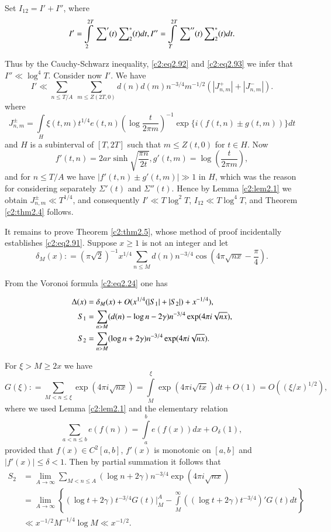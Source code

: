 Set $I_{12} = I'+ I''$, where
$$
I' = \int\limits_2^{2T} \sideset{}{'}\sum (t) \sideset{}{_2^*}\sum (t)
dt, I'' = \int\limits_T^{2T} \sideset{}{''}\sum(t) \sideset{}{_2^*}\sum (t) dt.
$$

Thus by the Cauchy-Schwarz inequality, \eqref{c2:eq2.92} and
\eqref{c2:eq2.93} we infer that $I'' \ll \log ^4 T$. Consider now
$I'$. We have
$$ 
I' \ll \sum_{n \leq T/A} ~\sum_{m \leq Z (2T,  0)} d(n) d (m) n^{-3/4}
m^{-1/2} \left(|J^+_{n, m}| +|J^-_{n, m}| \right).
$$
where\pageoriginale
$$
J^{\pm}_{n, m} = \int\limits_H \xi (t, m) t^{1/4} e (t, n) \left(\log
\frac{t}{2 \pi m} \right)^{-1} \exp \{ i (f (t, n) \pm g(t, m))\} dt
$$
and $H$ is a subinterval of $[T, 2 T]$ such that $m \leq Z(t, 0)$ for
$t \in H$. Now
$$
f' (t, n)= 2 ar \sinh \sqrt{\frac{\pi n}{2t}}, g' (t, m) = \log
\left(\frac{t}{2 \pi m} \right),
$$
and for $n \leq T/A$ we have $|f' (t, n) \pm g' (t, m)|\gg 1$ in $H$,
which was the reason for considering separately $\Sigma'(t)$ and
$\Sigma'' (t)$. Hence by Lemma \ref{c2:lem2.1} we obtain  $J^{\pm}_{n,
m} \ll T^{1/4}$, and consequently $I' \ll T \log^2 T$, $I_{12} \ll T
\log ^4 T$, and Theorem \ref{c2:thm2.4} follows.

It remains to prove Theorem \ref{c2:thm2.5}, whose method of proof
incidentally establishes \eqref{c2:eq2.91}. Suppose $x \geq 1$ is not
an integer and let
$$
\delta_M (x) : = (\pi \sqrt{2})^{-1} x^{1/4} \sum_{n \leq M} d(n)
n^{-3/4} \cos \left(4 \pi \sqrt{nx} - \frac{\pi}{4}\right).
$$

From the Voronoi formula \eqref{c2:eq2.24} one has

\begin{align}
  \Delta  (x) & = \delta_M (x) + O (x^{1/4}(|S_1|+ |S_2|)+
  x^{-1/4}),\label{c2:eq2.94}\\
  S_1 & = \sum_{n > M} (d(n) - \log n - 2 \gamma) n^{-3/4} \exp (4 \pi
  i \sqrt{nx}),\notag\\
  S_2 & = \sum_{n > M} (\log n + 2 \gamma) n^{-3/4} \exp (4 \pi i
  \sqrt{nx}).\notag 
\end{align}

For $\xi > M \geq 2x$ we have
\begin{equation}
  G(\xi): = \sum_{M < n \leq \xi} \exp (4 \pi i \sqrt{nx})= \int\limits_M^\xi
 \exp (4 \pi i \sqrt{tx}) dt + O(1) = O ((\xi/ x)^{1/2}),\label{c2:eq2.95}
\end{equation}
where we used Lemma \ref{c2:lem2.1} and the elementary relation
\begin{equation}
  \sum_{a < n \leq b} e(f(n)) = \int\limits_a^b e(f(x))dx + O_\delta
  (1),\label{c2:eq2.96} 
\end{equation}
provided that $f(x) \in C^2 [a, b]$, $f'(x)$ is monotonic on $[a, b]$
and $|f'(x)|\leq \delta < 1$. Then by partial summation it follows
that
\begin{align*}
  S_2 & = \lim\limits_{A \to \infty} \sum_{M < n \leq A} (\log n + 2
  \gamma)n^{-3/4} \exp (4 \pi i \sqrt{nx})\\
  & = \lim\limits_{A \to \infty} \left\{(\log t + 2 \gamma) t^{-3/4}
  G(t) \Bigg|_M^A - \int\limits_M^\infty ((\log t + 2
  \gamma)t^{-3/4})' G(t) dt \right\}\\
  & \ll x^{-1/2} M^{-1/4} \log M \ll x^{-1/2}.
\end{align*}

